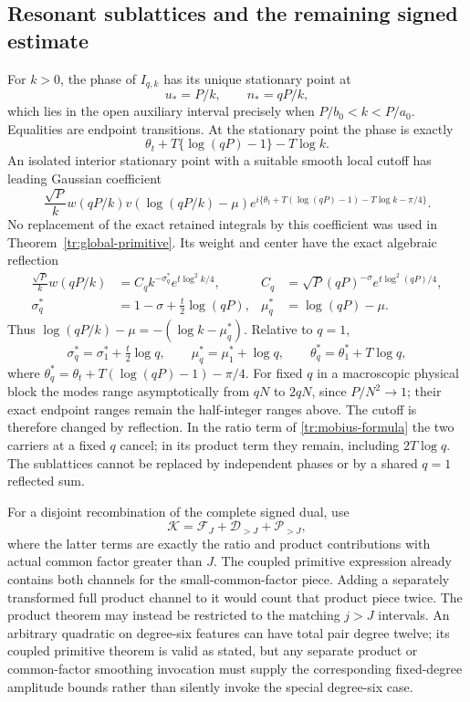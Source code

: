 \documentclass[11pt]{article}
\numberwithin{equation}{section}
\theoremstyle{definition}
\theoremstyle{remark}
\begin{document}
\subsection{Resonant sublattices and the remaining signed estimate}

For $k>0$, the phase of $I_{q,k}$ has its unique stationary point at
\[
 u_*=P/k,\qquad n_*=qP/k,
\]
which lies in the open auxiliary interval precisely when
$P/b_0<k<P/a_0$.  Equalities are endpoint transitions.  At the stationary
point the phase is exactly
\[
 \theta_t+T\{\log(qP)-1\}-T\log k.
\]
An isolated interior stationary point with a suitable smooth local
cutoff has leading Gaussian coefficient
\[
 \frac{\sqrt P}{k}w(qP/k)
 v(\log(qP/k)-\mu)
 e^{i\{\theta_t+T(\log(qP)-1)-T\log k-\pi/4\}}.
\]
No replacement of the exact retained integrals by this coefficient was
used in Theorem~\ref{tr:global-primitive}.  Its weight and center have the
exact algebraic reflection
\begin{align*}
 \frac{\sqrt P}{k}w(qP/k)&=C_qk^{-\sigma_q^*}e^{t\log^2k/4},&
 C_q&=\sqrt P(qP)^{-\sigma}e^{t\log^2(qP)/4},\\
 \sigma_q^*&=1-\sigma+\tfrac t2\log(qP),&
 \mu_q^*&=\log(qP)-\mu.
\end{align*}
Thus $\log(qP/k)-\mu=-(\log k-\mu_q^*)$.  Relative to $q=1$,
\[
 \sigma_q^*=\sigma_1^*+\tfrac t2\log q,\qquad
 \mu_q^*=\mu_1^*+\log q,\qquad
 \theta_q^*=\theta_1^*+T\log q,
\]
where $\theta_q^*=\theta_t+T(\log(qP)-1)-\pi/4$.
For fixed $q$ in a macroscopic physical block the modes range
asymptotically from $qN$ to $2qN$, since $P/N^2\to1$; their exact
endpoint ranges remain the half-integer ranges above.  The cutoff is
therefore changed by reflection.  In the ratio term of
\eqref{tr:mobius-formula} the two carriers at a fixed $q$ cancel; in its
product term they remain, including $2T\log q$.  The sublattices cannot
be replaced by independent phases or by a shared $q=1$ reflected sum.

For a disjoint recombination of the complete signed dual, use
\[
 \mathcal K=\mathcal F_J+\mathcal D_{>J}+\mathcal P_{>J},
\]
where the latter terms are exactly the ratio and product contributions
with actual common factor greater than $J$.  The coupled primitive
expression already contains both channels for the small-common-factor
piece.  Adding a separately transformed full product channel to it
would count that product piece twice.  The product theorem may instead
be restricted to the matching $j>J$ intervals.  An arbitrary quadratic
on degree-six features can have total pair degree twelve; its coupled
primitive theorem is valid as stated, but any separate product or
common-factor smoothing invocation must supply the corresponding
fixed-degree amplitude bounds rather than silently invoke the
special degree-six case.
\end{document}

